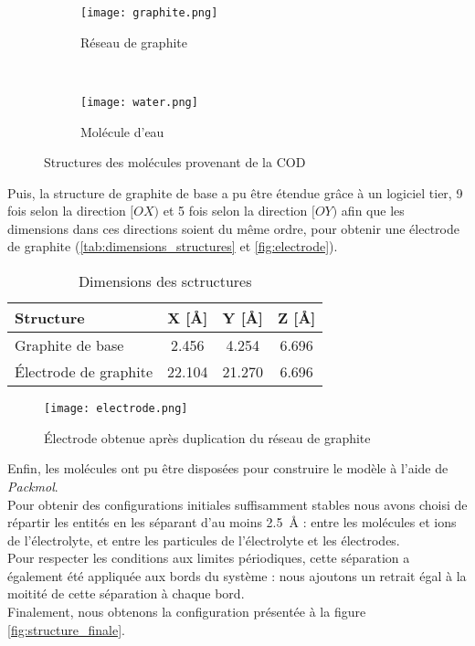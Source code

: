 \begin{figure}[hbt]
	\centering
	\begin{subfigure}[t]{.49\textwidth}
		\centering
		\texttt{[image: graphite.png]}
		\caption{Réseau de graphite}
	\end{subfigure}%
    ~
	\begin{subfigure}[t]{.49\textwidth}
		\centering
		\texttt{[image: water.png]}
		\caption{Molécule d'eau}
	\end{subfigure}
	\caption{Structures des molécules provenant de la COD}
	\label{fig:molecules_initiales}
\end{figure}

Puis, la structure de graphite de base a pu être étendue grâce à un logiciel tier\cite{momma_vesta_2011}, \num{9} fois selon la direction $[OX)$ et \num{5} fois selon la direction $[OY)$ afin que les dimensions dans ces directions soient du même ordre, pour obtenir une électrode de graphite (\autoref{tab:dimensions_structures} et \autoref{fig:electrode}).

\begin{table}[htb]
    \centering
    \begin{tabular}{l c c c}
        \hline
        Structure &X [Å] &Y [Å] &Z [Å]\\
        \hline
        Graphite de base &\num{2.456} &\num{4.254} &\num{6.696}\\
        Électrode de graphite &\num{22.104} &\num{21.270} &\num{6.696}\\
        \hline
    \end{tabular}
    \caption{Dimensions des sctructures}
    \label{tab:dimensions_structures}
\end{table}

\begin{figure}[htb]
    \centering
    \texttt{[image: electrode.png]}
    \caption{Électrode obtenue après duplication du réseau de graphite}
    \label{fig:electrode}
\end{figure}

Enfin, les molécules ont pu être disposées pour construire le modèle à l'aide de \emph{Packmol}\cite{martinez_packmol_2009}.\\
Pour obtenir des configurations initiales suffisamment stables nous avons choisi de répartir les entités en les séparant d'au moins \qty{2.5}{\angstrom} : entre les molécules et ions de l'électrolyte, et entre les particules de l'électrolyte et les électrodes.\\
Pour respecter les conditions aux limites périodiques, cette séparation a également été appliquée aux bords du système : nous ajoutons un retrait égal à la moitité de cette séparation à chaque bord.\\
Finalement, nous obtenons la configuration présentée à la figure \autoref{fig:structure_finale}.

